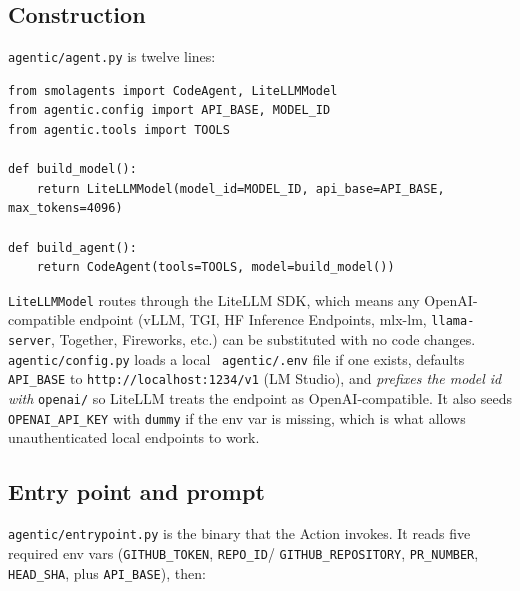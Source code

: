 \documentclass[11pt,a4paper]{article}
\newcommand{\code}[1]{\texttt{\small #1}}
\renewcommand{\path}[1]{\texttt{\small\color{mute} #1}}
\begin{document}
\subsection{Construction}

\code{agentic/agent.py} is twelve lines:

\begin{lstlisting}
from smolagents import CodeAgent, LiteLLMModel
from agentic.config import API_BASE, MODEL_ID
from agentic.tools import TOOLS

def build_model():
    return LiteLLMModel(model_id=MODEL_ID, api_base=API_BASE, max_tokens=4096)

def build_agent():
    return CodeAgent(tools=TOOLS, model=build_model())
\end{lstlisting}

\code{LiteLLMModel} routes through the LiteLLM SDK, which means any
OpenAI-compatible endpoint (vLLM, TGI, HF Inference Endpoints, mlx-lm,
\code{llama-server}, Together, Fireworks, etc.) can be substituted with no
code changes. \code{agentic/config.py} loads a local \path{agentic/.env}
file if one exists, defaults \code{API\_BASE} to \code{http://localhost:1234/v1}
(LM Studio), and \emph{prefixes the model id with} \code{openai/} so LiteLLM
treats the endpoint as OpenAI-compatible. It also seeds \code{OPENAI\_API\_KEY}
with \code{dummy} if the env var is missing, which is what allows
unauthenticated local endpoints to work.

\subsection{Entry point and prompt}
\label{sec:prompt}

\code{agentic/entrypoint.py} is the binary that the Action invokes. It reads
five required env vars (\code{GITHUB\_TOKEN}, \code{REPO\_ID}/%
\code{GITHUB\_REPOSITORY}, \code{PR\_NUMBER}, \code{HEAD\_SHA}, plus
\code{API\_BASE}), then:
\end{document}
